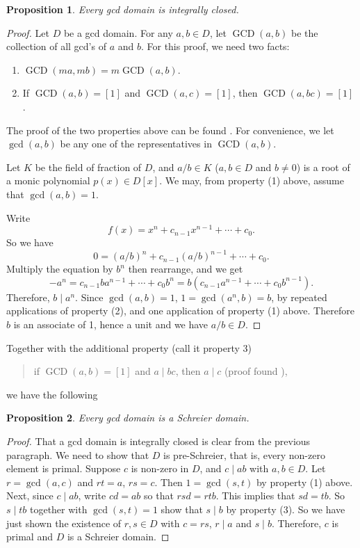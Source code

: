 \documentclass[12pt]{article}
\newtheorem{prop}{Proposition}
\newcommand{\GCD}{\operatorname{GCD}}
\begin{document}
\begin{prop} Every gcd domain is integrally closed. \end{prop}

\begin{proof}  Let $D$ be a gcd domain.  For any $a,b\in D$, let $\GCD(a,b)$ be the collection of all gcd's of $a$ and $b$.  For this proof, we need two facts:
\begin{enumerate}
\item $\GCD(ma,mb)=m\GCD(a,b)$.
\item If $\GCD(a,b)=[1]$ and $\GCD(a,c)=[1]$, then $\GCD(a,bc)=[1]$.
\end{enumerate}

The proof of the two properties above can be found .  For convenience, we let $\gcd(a,b)$ be any one of the representatives in $\GCD(a,b)$.

Let $K$ be the field of fraction of $D$, and $a/b \in K$ ($a,b\in D$ and $b\ne 0$) is a root of a monic polynomial $p(x)\in D[x]$.  We may, from property (1) above, assume that $\gcd(a,b)=1$.  

Write $$f(x)=x^n+c_{n-1}x^{n-1}+\cdots+c_0.$$ So we have
$$0=(a/b)^n+c_{n-1}(a/b)^{n-1}+\cdots+c_0.$$  Multiply the equation by $b^n$ then rearrange, and we get
$$-a^n=c_{n-1}ba^{n-1}+\cdots+c_0b^n=b(c_{n-1}a^{n-1}+\cdots+c_0b^{n-1}).$$
Therefore, $b\mid a^n$.  Since $\gcd(a,b)=1$, $1=\gcd(a^n,b)=b$, by repeated applications of property (2), and one application of property (1) above.  Therefore $b$ is an associate of 1, hence a unit and we have $a/b\in D$.

\end{proof}

Together with the additional property (call it property 3)
\begin{quote} if $\GCD(a,b)=[1]$ and $a\mid bc$, then $a\mid c$ (proof found ), \end{quote}
we have the following

\begin{prop} Every gcd domain is a Schreier domain. \end{prop}

\begin{proof}  
That a gcd domain is integrally closed is clear from the previous paragraph.  We need to show that $D$ is pre-Schreier, that is, every non-zero element is primal.  Suppose $c$ is non-zero in $D$, and $c\mid ab$ with $a,b\in D$.
Let $r=\gcd(a,c)$ and $rt=a$, $rs=c$.  Then $1=\gcd(s,t)$ by property (1) above.  Next, since $c\mid ab$, write $cd=ab$ so that $rsd=rtb$.  This implies that $sd=tb$.  So $s\mid tb$ together with $\gcd(s,t)=1$ show that $s\mid b$ by property (3).  So we have just shown the existence of $r,s\in D$ with $c=rs$, $r\mid a$ and $s\mid b$.  Therefore, $c$ is primal and $D$ is a Schreier domain.  

\end{proof}

\end{document}
